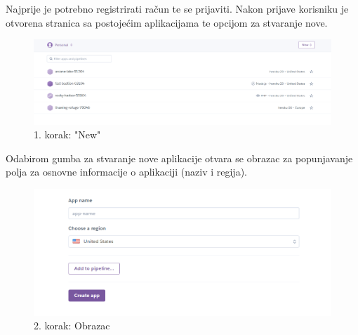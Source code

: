 {{			
Najprije je potrebno registrirati račun te se prijaviti. Nakon prijave korisniku je otvorena stranica sa postojećim aplikacijama te opcijom za stvaranje nove. 
				\begin{figure}[H]
					\centering
					\includegraphics[width=1\linewidth]{"slike/herokuNewApp.png"}
					\caption{1. korak: "New"}
				\end{figure}
\eject			
			
 Odabirom gumba za stvaranje nove aplikacije otvara se obrazac za popunjavanje polja za osnovne informacije o aplikaciji (naziv i regija).
				\begin{figure}[H]
					\centering
					\includegraphics[width=1\linewidth]{"slike/herokuNew.png"}
					\caption{2. korak: Obrazac}
				\end{figure}						
			
}}
